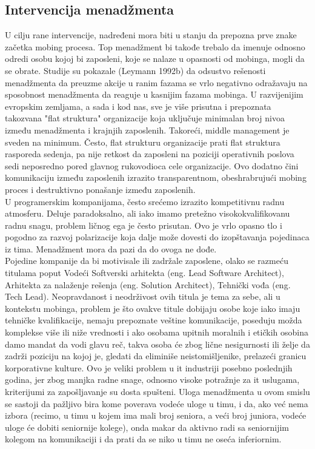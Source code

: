 \documentclass[a4paper]{article}
\newcommand{\quotes}[1]{"#1"}
\begin{document}
    \subsection{Intervencija menadžmenta}
    U cilju rane intervencije, nadređeni mora biti u stanju da prepozna prve znake začetka mobing procesa. Top menadžment bi takođe trebalo da imenuje odnosno odredi osobu kojoj bi zaposleni, koje se nalaze u opasnosti od mobinga, mogli da se obrate.
    Studije su pokazale (Leymann 1992b) da odsustvo rešenosti menadžmenta da preuzme akcije u ranim fazama se vrlo negativno odražavaju na sposobnost menadžmenta da reaguje u kasnijim fazama mobinga.
    U razvijenijim evropskim zemljama, a sada i kod nas, sve je više prisutna i prepoznata takozvana \quotes{flat struktura} organizacije koja uključuje minimalan broj nivoa između menadžmenta i krajnjih zaposlenih. Takoreći, middle management je sveden na minimum. Često, flat strukturu organizacije prati flat struktura rasporeda sedenja, pa nije retkost da zaposleni na poziciji operativnih poslova sedi neposredno pored glavnog rukovodioca cele organizacije. Ovo dodatno čini komunikaciju između zaposlenih izrazito transparentnom, obeshrabrujući mobing proces i destruktivno ponašanje između zaposlenih.\\
    U programerskim kompanijama, često srećemo izrazito kompetitivnu radnu atmosferu. Deluje paradoksalno, ali iako imamo pretežno visokokvalifikovanu radnu snagu, problem ličnog ega je često prisutan. Ovo je vrlo opasno tlo i pogodno za razvoj polarizacije koja dalje može dovesti do izopštavanja pojedinaca iz tima. Menadžment mora da pazi da do ovoga ne dođe.\\Pojedine kompanije da bi motivisale ili zadržale zaposlene, olako se razmeću titulama poput Vodeći Softverski arhitekta (eng. Lead Software Architect), Arhitekta za nalaženje rešenja (eng. Solution Architect), Tehnički vođa (eng. Tech Lead). Neopravdanost i neodrživost ovih titula je tema za sebe, ali u kontekstu mobinga, problem je što ovakve titule dobijaju osobe koje iako imaju tehničke kvalifikacije, nemaju prepoznate veštine komunikacije, poseduju možda komplekse više ili niže vrednosti i ako osobama upitnih moralnih i etičkih osobina damo mandat da vodi glavu reč, takva osoba će zbog lične nesigurnosti ili želje da zadrži poziciju na kojoj je, gledati da eliminiše neistomišljenike, prelazeći granicu korporativne kulture. Ovo je veliki problem u \acrshort{it} industriji posebno poslednjih godina, jer zbog manjka radne snage, odnosno visoke potražnje za \acrshort{it} uslugama, kriterijumi za zapošljavanje su dosta spušteni.
    Uloga menadžmenta u ovom smislu se sastoji da pažljivo bira kome poverava vodeće uloge u timu, i da, ako već nema izbora (recimo, u timu u kojem ima mali broj seniora, a veći broj juniora, vodeće uloge će dobiti seniornije kolege), onda makar da aktivno radi sa seniornijim kolegom na komunikaciji i da prati da se niko u timu ne oseća inferiornim.
\end{document}
